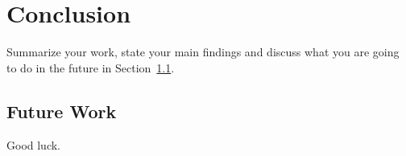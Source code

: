 \chapter{Conclusion}
\label{cha:conc}

Summarize your work, state your main findings and discuss what you are
going to do in the future in Section~\ref{sec:future}.


\section{Future Work}
\label{sec:future}
Good luck.



